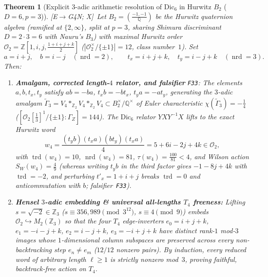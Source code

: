 \documentclass[11pt]{amsart}
\numberwithin{equation}{section}
\theoremstyle{plain}
\newtheorem{theorem}{Theorem}[section]
\theoremstyle{definition}\newtheorem{definition}[theorem]{Definition}
\theoremstyle{remark}\newtheorem{remark}[theorem]{Remark}
\newcommand{\Q}{\mathbb{Q}}
\newcommand{\Z}{\mathbb{Z}}
\newcommand{\calO}{\mathcal{O}}
\newcommand{\nrd}{\operatorname{nrd}}
\newcommand{\trd}{\operatorname{trd}}
\newcommand{\ctag}[1]{\textup{\textsf{\scriptsize[#1]}}}
\begin{document}
\begin{theorem}[Explicit $3$-adic arithmetic resolution of $\mathrm{Dic}_6$ in Hurwitz $B_2$ ($D{=}6, p{=}3$)]\label{thm:hurwitz_dic6}
\ctag{E$\to$G4N; X}\ Let $B_2=(\frac{-1,-1}{\Q})$ be the Hurwitz quaternion algebra (ramified at $\{2,\infty\}$, split at $p=3$, sharing Shimura discriminant $D=2\cdot 3=6$ with Nauru's $B_3$) with maximal Hurwitz order $\calO_2=\Z[1,i,j,\frac{1+i+j+k}{2}]$ ($|\calO_2^\times/\{\pm 1\}|=12$, class number~$1$). Set
\begin{equation}\label{eq:hurwitz_gens}
a = i+j,\quad b = i-j \quad (\nrd=2), \qquad
t_x = i+j+k,\quad t_y = i-j+k \quad (\nrd=3).
\end{equation}
Then:
\begin{enumerate}[label=(\alph*),nosep]
\item \textbf{Amalgam, corrected length-$4$ relator, and falsifier} \textup{\texttt{F33}}: The elements $a,b,t_x,t_y$ satisfy $ab=-ba$, $t_x b=-bt_x$, $t_y a=-at_y$, generating the $3$-adic amalgam $\tilde{\Gamma}_3=V_4*_{\Z_2}V_4*_{\Z_2}V_4\subset B_2^\times/\Q^\times$ of Euler characteristic $\chi(\tilde{\Gamma}_3)=-\tfrac14$ ($[\calO_2[\tfrac13]^1/\{\pm 1\}:\Gamma_Z]=144$). The $\mathrm{Dic}_6$ relator $YXY^{-1}X$ lifts to the exact Hurwitz word
\begin{equation}\label{eq:hurwitz_w4}
w_4 = \frac{(t_y b)(t_x a)(b t_y)(t_x a)}{4} = 5 + 6i - 2j + 4k \in \calO_2,
\end{equation}
with $\trd(w_4)=10$, $\nrd(w_4)=81$, $\tau(w_4)=\frac{100}{81}<4$, and Wilson action $S_W(w_4)=\frac{4}{9}$ (whereas writing $t_y b$ in the third factor gives $-1-8j+4k$ with $\trd=-2$, and perturbing $t'_x=1+i+j$ breaks $\trd=0$ and anticommutation with $b$; falsifier~\textup{\texttt{F33}}).
\item \textbf{Hensel $3$-adic embedding \& universal all-lengths $T_4$ freeness:} Lifting $s=\sqrt{-2}\in\Z_3$ ($s\equiv 356{,}989\pmod{3^{12}}$, $s\equiv 4\pmod 9$) embeds $\calO_2\hookrightarrow M_2(\Z_3)$ so that the four $T_4$ edge-inverters $e_0=i+j+k$, $e_1=-i-j+k$, $e_2=i-j+k$, $e_3=-i+j+k$ have distinct rank-$1$ mod-$3$ images whose $1$-dimensional column subspaces are preserved across every non-backtracking step $e_n\ne e_m$ ($12/12$ nonzero pairs). By induction, every reduced word of arbitrary length $\ell\ge 1$ is strictly nonzero mod~$3$, proving faithful, backtrack-free action on $T_4$.

\end{enumerate}
\end{theorem}
\end{document}
